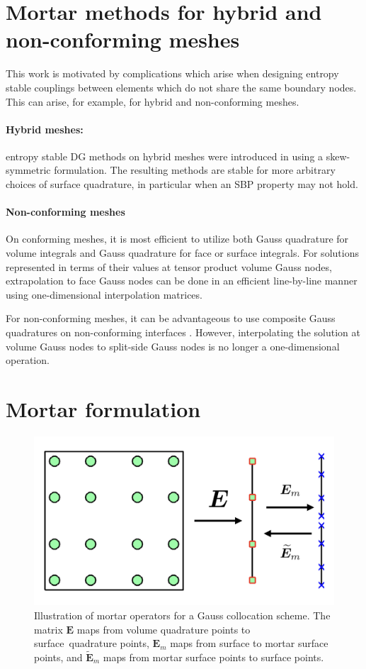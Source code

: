 \documentclass[review]{siamart0216}
\renewcommand{\tilde}{\widetilde}
\begin{document}
\section{Mortar methods for hybrid and non-conforming meshes}

This work is motivated by complications which arise when designing entropy stable couplings between elements which do not share the same boundary nodes.  This can arise, for example, for hybrid and non-conforming meshes.  

\paragraph{Hybrid meshes:} entropy stable DG methods on hybrid meshes were introduced in \cite{chan2019skew} using a skew-symmetric formulation.  The resulting methods are stable for more arbitrary choices of surface quadrature, in particular when an SBP property may not hold.  

\paragraph{Non-conforming meshes}

On conforming meshes, it is most efficient to utilize both Gauss quadrature for volume integrals and Gauss quadrature for face or surface integrals.  For solutions represented in terms of their values at tensor product volume Gauss nodes, extrapolation to face Gauss nodes can be done in an efficient line-by-line manner using one-dimensional interpolation matrices.  

For non-conforming meshes, it can be advantageous to use composite Gauss quadratures on non-conforming interfaces \cite{Kozdon2018}.  However, interpolating the solution at volume Gauss nodes to split-side Gauss nodes is no longer a one-dimensional operation.  

\section{Mortar formulation}

\begin{figure}[!h]
\centering
\includegraphics[width=.5\textwidth]{figs/mortar.png}
\caption{Illustration of mortar operators for a Gauss collocation scheme.  The matrix $\bm{E}$ maps from volume quadrature points to surface quadrature points, $\bm{E}_m$ maps from surface to mortar surface points, and $\tilde{\bm{E}}_m$ maps from mortar surface points to surface points. }
\label{fig:gqcon_noncon}
\end{figure}
\end{document}
